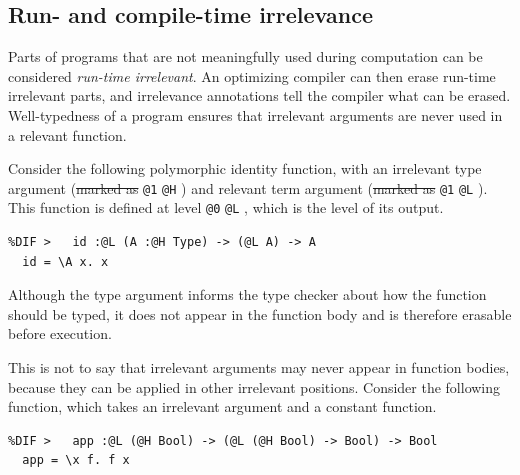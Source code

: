 \documentclass[acmsmall, screen=true, nonacm=true,
  review=\ifpublic false\else true\fi,
  anonymous=\ifanonymous true\else false\fi
]{acmart}
\providecommand{\DIFdel}[1]{{\protect\color{red}\sout{#1}}}                      %
\providecommand{\DIFaddbegin}{} %
\providecommand{\DIFaddend}{} %
\providecommand{\DIFdelbegin}{} %
\providecommand{\DIFdelend}{} %
\providecommand{\DIFmodbegin}{} %
\providecommand{\DIFmodend}{} %
\begin{document}
\subsection{Run- and compile-time irrelevance}

Parts of programs that are not meaningfully used during computation
can be considered \emph{run-time irrelevant}.
An optimizing compiler can then erase run-time irrelevant parts,
and irrelevance annotations tell the compiler what can be erased.
Well-typedness of a program ensures that irrelevant arguments
are never used in a relevant function.

Consider the following polymorphic identity function,
with an irrelevant type argument (\DIFdelbegin \DIFdel{marked as }%
{\color{red}%
\lstinline{@1}%
}%
\DIFdelend \DIFaddbegin {\color{blue}%
\lstinline{@H}%
}%
\DIFaddend )
and relevant term argument (\DIFdelbegin \DIFdel{marked as }%
{\color{red}%
\lstinline{@1}%
}%
\DIFdelend \DIFaddbegin {\color{blue}%
\lstinline{@L}%
}%
\DIFaddend ). This
function is defined at level \DIFdelbegin %
{\color{red}%
\lstinline{@0}%
}%
\DIFdelend \DIFaddbegin {\color{blue}%
\lstinline{@L}%
}%
\DIFaddend , which is the level of
its output.

\DIFmodbegin
\begin{lstlisting}[alsolanguage=DIFcode]
%DIF <   id :@0 (A :@1 Type) -> (@0 A) -> A
%DIF >   id :@L (A :@H Type) -> (@L A) -> A
  id = \A x. x
\end{lstlisting}
\DIFmodend

Although the type argument informs the type checker about how the function should be typed,
it does not appear in the function body and is therefore erasable
before execution.

This is not to say that irrelevant arguments may never appear in function bodies,
because they can be applied in other irrelevant positions.
Consider the following function,
which takes an irrelevant argument and a constant function.

\DIFmodbegin
\begin{lstlisting}[alsolanguage=DIFcode]
%DIF <   app :@0 (@1 Bool) -> (@0 (@1 Bool) -> Bool) -> Bool
%DIF >   app :@L (@H Bool) -> (@L (@H Bool) -> Bool) -> Bool
  app = \x f. f x
\end{lstlisting}
\DIFmodend
\end{document}
